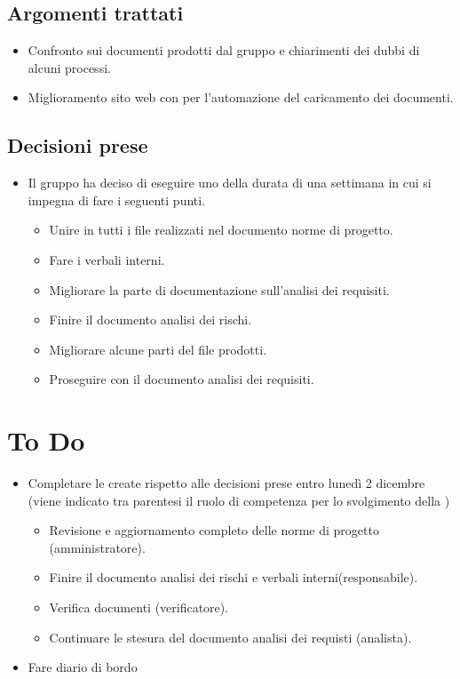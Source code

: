 \documentclass[a4paper, 12pt]{article}
\begin{document}
\subsection{Argomenti trattati}
\begin{itemize}
    \item Confronto sui documenti prodotti dal gruppo e chiarimenti dei dubbi di alcuni processi.
    \item Miglioramento sito web con  per l'automazione del caricamento dei documenti.
\end{itemize}

\subsection{Decisioni prese}
\begin{itemize}
    \item Il gruppo ha deciso di eseguire uno  della durata di una settimana in cui si impegna di fare i seguenti punti.
    \begin{itemize}
        \item Unire in  tutti i file realizzati nel documento norme di progetto.
        \item Fare i verbali interni.
        \item Migliorare la parte di documentazione sull'analisi dei requisiti.
        \item Finire il documento analisi dei rischi.
        \item Migliorare alcune parti del file prodotti.
        \item Proseguire con il documento analisi dei requisiti.
    \end{itemize}
\end{itemize}

\section{To Do}
    \begin{itemize}
        \item Completare le  create rispetto alle decisioni prese entro lunedì 2 dicembre (viene indicato tra parentesi il ruolo di competenza per lo svolgimento della )
        \begin{itemize}
            \item Revisione e aggiornamento completo delle norme di progetto (amministratore).
            \item Finire il documento analisi dei rischi e verbali interni(responsabile).
            \item Verifica documenti (verificatore).
            \item Continuare le stesura del documento analisi dei requisti (analista).
        \end{itemize}
        \item Fare diario di bordo
    \end{itemize}
\end{document}
